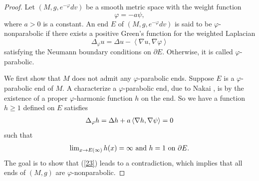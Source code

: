 \documentclass[12pt]{amsart}%
\numberwithin{equation}{section}
\begin{document}
\begin{proof}
Let $(M,g,e^{-\varphi}dv)$ be a smooth metric space with the weight function
\[
\varphi=-a\psi,
\]
where $a>0$ is a constant. An end $E$ of $(M,g,e^{-\varphi}dv)$ is said to be
$\varphi$-nonparabolic if there exists a positive Green's function for the
weighted Laplacian%
\[
\Delta_{\varphi}u=\Delta u-\left\langle \nabla u,\nabla\varphi\right\rangle
\]
satisfying the Neumann boundary conditions on $\partial E$. Otherwise, it is
called $\varphi$-parabolic.

We first show that $M$ does not admit any $\varphi$-parabolic ends. Suppose
$E$ is a $\varphi$-parabolic end of $M$. A characterize a $\varphi$-parabolic
end, due to Nakai \cite{na}, is by the existence of a proper $\varphi
$-harmonic function $h$ on the end. So we have a function $h\geq1$ defined on
$E$ satisfies
\begin{equation}%
\begin{array}
[c]{c}%
\Delta_{\varphi}h=\Delta h+a\left\langle \nabla h,\nabla\psi\right\rangle =0
\end{array}
\label{23a}%
\end{equation}
such that%
\begin{equation}%
\begin{array}
[c]{c}%
\lim_{x\rightarrow E(\infty)}h(x)=\infty\text{ }\mathrm{and}\text{ }h=1\text{
}\mathrm{on}\text{ }\partial E.
\end{array}
\label{23}%
\end{equation}
The goal is to show that (\ref{23}) leads to a contradiction, which implies
that all ends of $(M,g)$ are $\varphi$-nonparabolic.


\end{proof}
\end{document}
